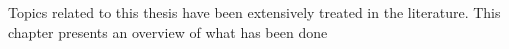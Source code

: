 Topics related to this thesis have been extensively treated in the literature.
This chapter presents an overview of what has been done 
